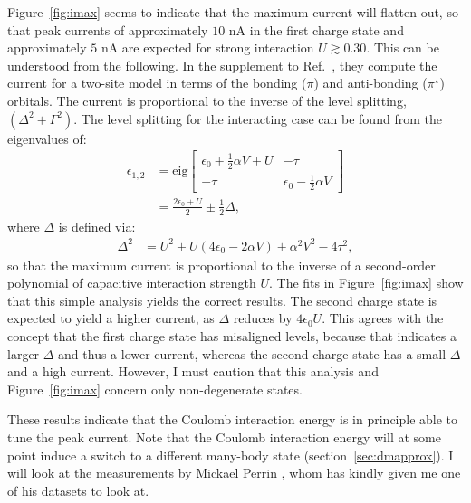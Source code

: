 Figure~\ref{fig:imax} seems to indicate that the maximum current will flatten out, so that peak currents of approximately $10$ nA in the first charge state and approximately $5$ nA are expected for strong interaction $U \gtrsim 0.30$. This can be understood from the following. In the supplement to Ref.~\cite{perrinnano}, they compute the current for a two-site model in terms of the bonding ($\pi$) and anti-bonding ($\pi^\star$) orbitals. The current is proportional to the inverse of the level splitting, $\left( \Delta^2 + \Gamma^2 \right)$. The level splitting for the interacting case can be found from the eigenvalues of:
\begin{align*}
    \epsilon_{1,2} &= \text{eig}\begin{bmatrix} \epsilon_0 + \frac{1}{2} \alpha V+U & -\tau \\
-\tau & \epsilon_0 - \frac{1}{2} \alpha V\end{bmatrix} \\
&= \frac{2\epsilon_0 + U}{2} \pm \frac{1}{2} \Delta,
\end{align*} where $\Delta$ is defined via:
\begin{align*}
\Delta^2 &= U^2 + U \left(4\epsilon_0 - 2 \alpha V\right) + \alpha^2 V^2 - 4 \tau^2,
\end{align*}
so that the maximum current is proportional to the inverse of a second-order polynomial of capacitive interaction strength $U$. The fits in Figure~\ref{fig:imax} show that this simple analysis yields the correct results. The second charge state is expected to yield a higher current, as $\Delta$ reduces by $4 \epsilon_0 U$. This agrees with the concept that the first charge state has misaligned levels, because that indicates a larger $\Delta$ and thus a lower current, whereas the second charge state has a small $\Delta$ and a high current. However, I must caution that this analysis and Figure~\ref{fig:imax} concern only non-degenerate states.

These results indicate that the Coulomb interaction energy is in principle able to tune the peak current. Note that the Coulomb interaction energy will at some point induce a switch to a different many-body state (section~\ref{sec:dmapprox}). I will look at the measurements by Mickael Perrin \cite{perrin, perrinnano}, whom has kindly given me one of his datasets to look at. 

